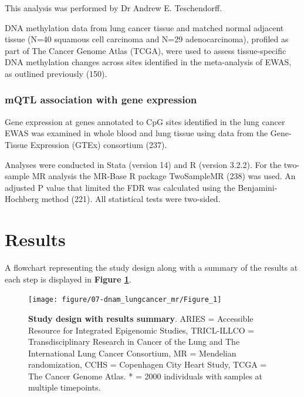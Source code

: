 \documentclass[11pt,oneside]{bristolthesis}
\newcommand{\blandscape}{\begin{landscape}}
\newcommand{\elandscape}{\end{landscape}}
\begin{document}
This analysis was performed by Dr Andrew E. Teschendorff.

DNA methylation data from lung cancer tissue and matched normal adjacent tissue (N=40 squamous cell carcinoma and N=29 adenocarcinoma), profiled as part of The Cancer Genome Atlas (TCGA), were used to assess tissue-specific DNA methylation changes across sites identified in the meta-analysis of EWAS, as outlined previously (150).

\hypertarget{mqtl-association-with-gene-expression}{%
\subsubsection{mQTL association with gene expression}\label{mqtl-association-with-gene-expression}}

Gene expression at genes annotated to CpG sites identified in the lung cancer EWAS was examined in whole blood and lung tissue using data from the Gene-Tissue Expression (GTEx) consortium (237).

Analyses were conducted in Stata (version 14) and R (version 3.2.2). For the two-sample MR analysis the MR-Base R package TwoSampleMR (238) was used. An adjusted P value that limited the FDR was calculated using the Benjamini-Hochberg method (221). All statistical tests were two-sided.

\hypertarget{results-07}{%
\section{Results}\label{results-07}}

A flowchart representing the study design along with a summary of the results at each step is displayed in \textbf{Figure \ref{fig:fig1-07}}.





\blandscape
\begin{figure}[htbp]

{\centering \texttt{[image: figure/07-dnam\_lungcancer\_mr/Figure\_1]} 

}

\caption[Study design with results summary]{\textbf{Study design with results summary}. ARIES = Accessible Resource for Integrated Epigenomic Studies, TRICL-ILLCO = Transdisciplinary Research in Cancer of the Lung and The International Lung Cancer Consortium, MR = Mendelian randomization, CCHS = Copenhagen City Heart Study, TCGA = The Cancer Genome Atlas. * = 2000 individuals with samples at multiple timepoints.}\label{fig:fig1-07}
\end{figure}
\elandscape
\end{document}
